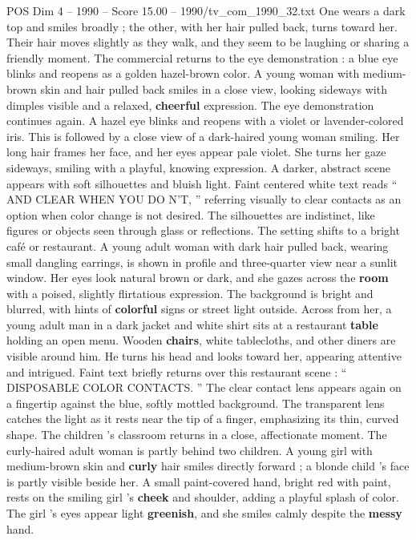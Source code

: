 \begin{textsample}{POS Dim 4 – 1990 – Score 15.00 – 1990/tv\_com\_1990\_32.txt}
One wears a dark top and smiles broadly ; the other, with her hair pulled back, turns toward her.
Their hair moves slightly as they walk, and they seem to be laughing or sharing a friendly moment.
The commercial returns to the eye demonstration : a blue eye blinks and reopens as a golden hazel-brown color.
A young woman with medium-brown skin and hair pulled back smiles in a close view, looking sideways with dimples visible and a relaxed, \textbf{cheerful} expression.
The eye demonstration continues again.
A hazel eye blinks and reopens with a violet or lavender-colored iris.
This is followed by a close view of a dark-haired young woman smiling.
Her long hair frames her face, and her eyes appear pale violet.
She turns her gaze sideways, smiling with a playful, knowing expression.
A darker, abstract scene appears with soft silhouettes and bluish light.
Faint centered white text reads “ AND CLEAR WHEN YOU DO N’T, ” referring visually to clear contacts as an option when color change is not desired.
The silhouettes are indistinct, like figures or objects seen through glass or reflections.
The setting shifts to a bright café or restaurant.
A young adult woman with dark hair pulled back, wearing small dangling earrings, is shown in profile and three-quarter view near a sunlit window.
Her eyes look natural brown or dark, and she gazes across the \textbf{room} with a poised, slightly flirtatious expression.
The background is bright and blurred, with hints of \textbf{colorful} signs or street light outside.
Across from her, a young adult man in a dark jacket and white shirt sits at a restaurant \textbf{table} holding an open menu.
Wooden \textbf{chairs}, white tablecloths, and other diners are visible around him.
He turns his head and looks toward her, appearing attentive and intrigued.
Faint text briefly returns over this restaurant scene : “ DISPOSABLE COLOR CONTACTS. ” The clear contact lens appears again on a fingertip against the blue, softly mottled background.
The transparent lens catches the light as it rests near the tip of a finger, emphasizing its thin, curved shape.
The children ’s classroom returns in a close, affectionate moment.
The curly-haired adult woman is partly behind two children.
A young girl with medium-brown skin and \textbf{curly} hair smiles directly forward ; a blonde child ’s face is partly visible beside her.
A small paint-covered hand, bright red with paint, rests on the smiling girl ’s \textbf{cheek} and shoulder, adding a playful splash of color.
The girl ’s eyes appear light \textbf{greenish}, and she smiles calmly despite the \textbf{messy} hand.

\end{textsample}

